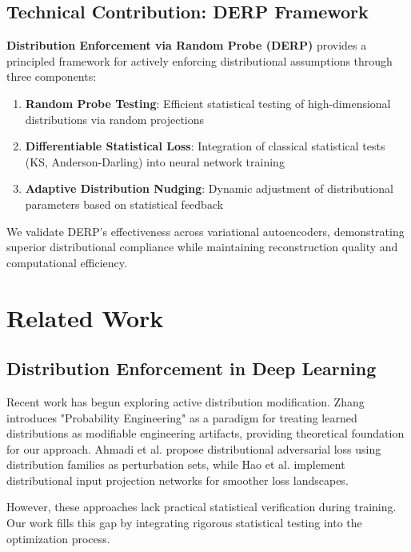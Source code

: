 \documentclass[11pt]{article}
\begin{document}
\subsection{Technical Contribution: DERP Framework}

\textbf{Distribution Enforcement via Random Probe (DERP)} provides a principled framework for actively enforcing distributional assumptions through three components:

\begin{enumerate}
\item \textbf{Random Probe Testing}: Efficient statistical testing of high-dimensional distributions via random projections
\item \textbf{Differentiable Statistical Loss}: Integration of classical statistical tests (KS, Anderson-Darling) into neural network training
\item \textbf{Adaptive Distribution Nudging}: Dynamic adjustment of distributional parameters based on statistical feedback
\end{enumerate}

We validate DERP's effectiveness across variational autoencoders, demonstrating superior distributional compliance while maintaining reconstruction quality and computational efficiency.

\section{Related Work}

\subsection{Distribution Enforcement in Deep Learning}

Recent work has begun exploring active distribution modification. Zhang \cite{zhang2025advancing} introduces "Probability Engineering" as a paradigm for treating learned distributions as modifiable engineering artifacts, providing theoretical foundation for our approach. Ahmadi et al. \cite{ahmadi2024distributional} propose distributional adversarial loss using distribution families as perturbation sets, while Hao et al. \cite{hao2025towards} implement distributional input projection networks for smoother loss landscapes.

However, these approaches lack practical statistical verification during training. Our work fills this gap by integrating rigorous statistical testing into the optimization process.
\end{document}
